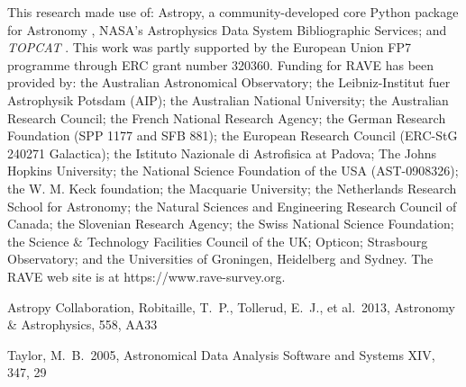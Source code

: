 \documentclass[preprint2,trackchanges]{aastex}
\newcommand{\project}[1]{\textsl{#1}}
\begin{document}
This research made use of: Astropy, a community-developed core Python package for
Astronomy \citep{astropy}, NASA's Astrophysics Data System Bibliographic Services;
 and \project{TOPCAT} \citep{Taylor2005}.
This work was partly supported by the European Union FP7 programme through ERC 
grant number 320360.
Funding for RAVE has been provided by: the Australian Astronomical Observatory; the Leibniz-Institut fuer Astrophysik Potsdam (AIP); the Australian National University; the Australian Research Council; the French National Research Agency; the German Research Foundation (SPP 1177 and SFB 881); the European Research Council (ERC-StG 240271 Galactica); the Istituto Nazionale di Astrofisica at Padova; The Johns Hopkins University; the National Science Foundation of the USA (AST-0908326); the W. M. Keck foundation; the Macquarie University; the Netherlands Research School for Astronomy; the Natural Sciences and Engineering Research Council of Canada; the Slovenian Research Agency; the Swiss National Science Foundation; the Science \& Technology Facilities Council of the UK; Opticon; Strasbourg Observatory; and the Universities of Groningen, Heidelberg and Sydney. The RAVE web site is at https://www.rave-survey.org.  



\begin{thebibliography}{dummy}
 Astropy Collaboration, Robitaille, T.~P., Tollerud, E.~J., et al.\ 2013, Astronomy \& Astrophysics, 558, AA33

 Taylor, M.~B.\ 2005, Astronomical Data Analysis Software and Systems XIV, 347, 29 

\end{thebibliography}

\clearpage

\end{document}
